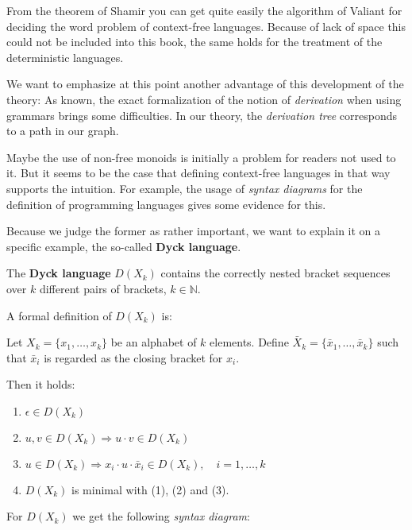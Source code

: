 From the theorem of Shamir you can get quite easily the algorithm of Valiant for
deciding the word problem of context-free languages. Because of lack of space
this could not be included into this book, the same holds for the treatment of
the  deterministic languages.

We want to emphasize at this point another advantage of this development of the
theory: As known, the exact formalization of the notion of {\em derivation}
when using grammars brings some difficulties. In our theory, the {\em derivation
tree} corresponds to a path in our graph.

Maybe the use of non-free monoids is initially a problem for readers not used to
it. But it seems to be the case that defining context-free
languages in that way supports the intuition. For example, the usage of
{\em syntax diagrams} for the definition of programming languages gives some
evidence for this.

Because we judge the former as rather important, we want to explain it on a
specific example, the so-called {\bf Dyck language}.


The {\bf Dyck language} $D(X_k)$ contains the correctly nested bracket sequences
over $k$ different pairs of brackets, $k \in \mathbb{N}$.

A formal definition of $D(X_k)$ is:

Let $X_k = \{ x_1, \ldots, x_k \}$ be an alphabet of $k$ elements. Define
$\bar{X}_k = \{ \bar{x}_1, \ldots, \bar{x}_k \}$ such that $\bar{x}_i$ is regarded 
as the closing bracket for $x_i$.

Then it holds:
\begin{enumerate}
  \item $\epsilon \in D(X_k)$
  \item $u, v \in D(X_k) \Rightarrow u \cdot v \in D(X_k)$
  \item $u \in D(X_k) \Rightarrow x_i \cdot u \cdot \bar{x}_i \in D(X_k),\quad i
  = 1, \ldots, k$
  \item $D(X_k)$ is minimal with (1), (2) and (3). 
\end{enumerate}

For $D(X_k)$ we get the following {\em syntax diagram}:

\begin{center}

\end{center}

